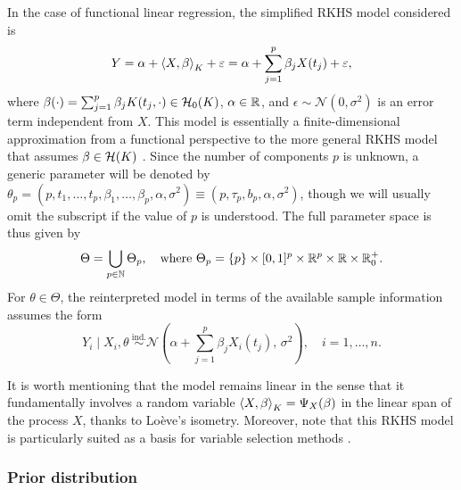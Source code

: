 In the case of functional linear regression, the simplified \acs{RKHS} model considered is
\[
  Y = \alpha + \left\langle X,\beta\right\rangle_K + \varepsilon = \alpha + \sum_{j=1}^p \beta_j X(t_j) + \varepsilon,
\]
where \(\beta(\cdot)=\sum_{j=1}^p\beta_j K(t_j, \cdot) \in \mathcal{H}_0(K)\), \(\alpha\in\mathbb{R}\), and \(\epsilon \sim \mathcal N(0,\sigma^2)\) is an error term independent from \(X\). This model is essentially a finite-dimensional approximation from a functional perspective to the more general \acs{RKHS} model that assumes \(\beta \in \mathcal{H}(K)\) \citep{berrendero2024functional}. Since the number of components \(p\) is unknown, a generic parameter will be denoted by \(\theta_p = (p, t_1,\dots, t_p, \beta_1,\dots, \beta_p, \alpha, \sigma^2) \equiv (p, \tau_p, b_p, \alpha, \sigma^2)\), though we will usually omit the subscript if the value of \(p\) is understood. The full parameter space is thus given by
\begin{equation}\label{eq:theta-parameter-space-bfr}
\Theta = \bigcup_{p\in\mathbb{N}}\Theta_p,\quad \text{where } \Theta_p = \left\{p\right\} \times [0, 1]^p \times \mathbb{R}^p  \times \mathbb{R} \times \mathbb{R}^+_0.
\end{equation}
For \(\theta \in \Theta\), the reinterpreted model in terms of the available sample information assumes the form
\begin{equation}\label{eq:rkhs-model-linear-2}
  Y_i \mid X_i, \theta \ \stackrel{\text{ind.}}{\sim} \mathcal N\left(\alpha + \sum_{j=1}^p \beta_j X_i(t_j),\, \sigma^2\right), \quad i =1,\dots, n.
\end{equation}

It is worth mentioning that the model remains linear in the sense that it fundamentally involves a random variable \(\left\langle X,\beta\right\rangle_K = \Psi_X(\beta)\) in the linear span of the process \(X\), thanks to Loève's isometry. Moreover, note that this \acs{RKHS} model is particularly suited as a basis for variable selection methods \citep[see][]{berrendero2019rkhs}.

\subsubsection*{Prior distribution}

